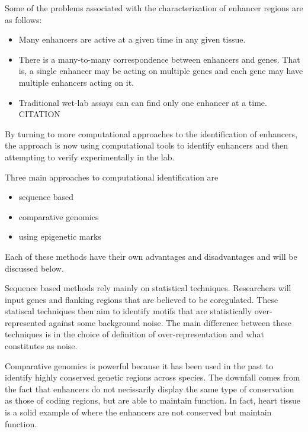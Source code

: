        Some of the problems associated with the characterization of enhancer regions are as follows:
        	\begin{itemize}
        		\item Many enhancers are active at a given time in any given tissue. 
        		\item There is a many-to-many correspondence between enhancers and genes. That is, a single enhancer may be acting on multiple genes and each gene may have multiple enhancers acting on it. 
        		\item Traditional wet-lab assays can can find only one enhancer at a time. CITATION
        	\end{itemize}
        By turning to more computational approaches to the identification of enhancers, the approach is now using computational tools to identify enhancers and then attempting to verify experimentally in the lab.

        Three main approaches to computational identification are
        	\begin{itemize}
        		\item sequence based 
        		\item comparative genomics
        		\item using epigenetic marks
        	\end{itemize}

        Each of these methods have their own advantages and disadvantages and will be discussed below.

        Sequence based methods rely mainly on statistical techniques. Researchers will input genes and flanking regions that are believed to be coregulated. These statiscal techniques then aim to identify motifs that are statistically over-represented against some background noise. The main difference between these techniques is in the choice of definition of over-representation and what constitutes as noise.

        Comparative genomics is powerful because it has been used in the past to identify highly conserved genetic regions across species. The downfall comes from the fact that enhancers do not necissarily display the same type of conservation as those of coding regions, but are able to maintain function. In fact, heart tissue is a solid example of where the enhancers are not conserved but maintain function. 



